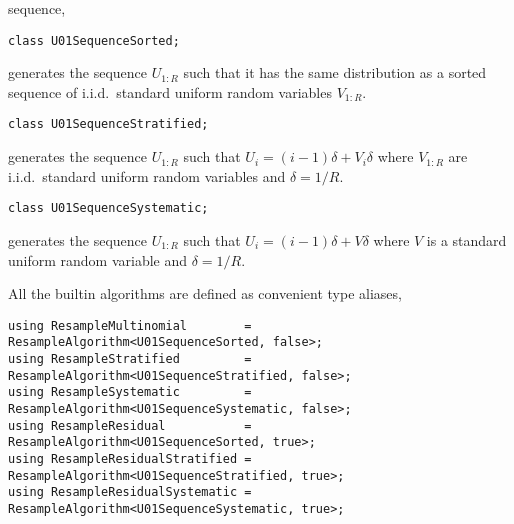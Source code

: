 sequence,
\begin{Verbatim}
class U01SequenceSorted;
\end{Verbatim}
generates the sequence $U_{1:R}$ such that it has the same distribution as a
sorted sequence of i.i.d.\ standard uniform random variables $V_{1:R}$.
\begin{Verbatim}
class U01SequenceStratified;
\end{Verbatim}
generates the sequence $U_{1:R}$ such that $U_i = (i - 1)\delta + V_i\delta$
where $V_{1:R}$ are i.i.d.\ standard uniform random variables and $\delta = 1 /
R$.
\begin{Verbatim}
class U01SequenceSystematic;
\end{Verbatim}
generates the sequence $U_{1:R}$ such that $U_i = (i - 1)\delta + V\delta$
where $V$ is a standard uniform random variable and $\delta = 1 / R$.

All the builtin algorithms are defined as convenient type aliases,
\begin{Verbatim}
using ResampleMultinomial        = ResampleAlgorithm<U01SequenceSorted, false>;
using ResampleStratified         = ResampleAlgorithm<U01SequenceStratified, false>;
using ResampleSystematic         = ResampleAlgorithm<U01SequenceSystematic, false>;
using ResampleResidual           = ResampleAlgorithm<U01SequenceSorted, true>;
using ResampleResidualStratified = ResampleAlgorithm<U01SequenceStratified, true>;
using ResampleResidualSystematic = ResampleAlgorithm<U01SequenceSystematic, true>;
\end{Verbatim}
